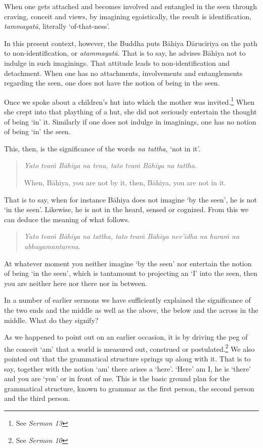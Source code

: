 When one gets attached and becomes involved and entangled in the seen through craving, conceit and views, by imagining egoistically, the result is identification, \emph{tammayatā}, literally `of-that-ness'.

In this present context, however, the Buddha puts Bāhiya Dārucīriya on the path to non-identification, or \emph{atammayatā}. That is to say, he advises Bāhiya not to indulge in such imaginings. That attitude leads to non-identification and detachment. When one has no attachments, involvements and entanglements regarding the seen, one does not have the notion of being in the seen.

Once we spoke about a children's hut into which the mother was invited.\footnote{See \emph{Sermon 13}} When she crept into that plaything of a hut, she did not seriously entertain the thought of being `in' it. Similarly if one does not indulge in imaginings, one has no notion of being `in' the seen.

This, then, is the significance of the words \emph{na tattha}, `not in it'.

\begin{quote}
\emph{Yato tvaṁ Bāhiya na tena, tato tvaṁ Bāhiya na tattha.}

When, Bāhiya, you are not by it, then, Bāhiya, you are not in it.
\end{quote}

That is to say, when for instance Bāhiya does not imagine `by the seen', he is not `in the seen'. Likewise, he is not in the heard, sensed or cognized. From this we can deduce the meaning of what follows.

\begin{quote}
\emph{Yato tvaṁ Bāhiya na tattha, tato tvaṁ Bāhiya nev'idha na huraṁ na ubhayamantarena}.
\end{quote}

At whatever moment you neither imagine `by the seen' nor entertain the notion of being `in the seen', which is tantamount to projecting an `I' into the seen, then you are neither here nor there nor in between.

In a number of earlier sermons we have sufficiently explained the significance of the two ends and the middle as well as the above, the below and the across in the middle. What do they signify?

As we happened to point out on an earlier occasion, it is by driving the peg of the conceit `am' that a world is measured out, construed or postulated.\footnote{See \emph{Sermon 10}} We also pointed out that the grammatical structure springs up along with it. That is to say, together with the notion `am' there arises a `here'. `Here' am I, he is `there' and you are `yon' or in front of me. This is the basic ground plan for the grammatical structure, known to grammar as the first person, the second person and the third person.

